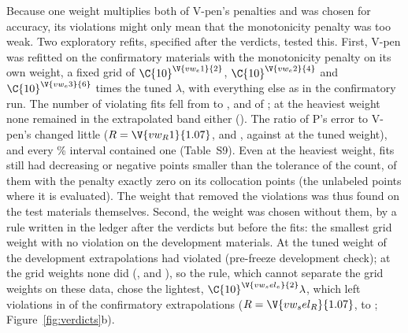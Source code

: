 \documentclass[journal=jcisd8,manuscript=article]{achemso}
\begin{document}
Because one weight multiplies both of V-pen's penalties and was chosen for accuracy, its violations might only mean
that the monotonicity penalty was too weak. Two exploratory refits, specified after the verdicts, tested this. First,
V-pen was refitted on the confirmatory materials with the monotonicity penalty on its own weight, a fixed grid of
$\C{10}^{\V{vw_e1}{2}}$, $\C{10}^{\V{vw_e2}{4}}$ and $\C{10}^{\V{vw_e3}{6}}$ times the tuned $\lambda$, with
everything else as in the confirmatory run. The number of violating fits fell from  to ,
 and  of ; at the heaviest weight none remained in the extrapolated band
either (). The ratio of P's error to V-pen's changed little ($R = \V{vw_R1}{1.07}$,  and
, against  at the tuned weight), and every \% interval contained one
(Table~S9). Even at the heaviest weight,  fits still had decreasing or negative points smaller than
the tolerance of the count,  of them with the penalty exactly zero on its collocation points (the
unlabeled points where it is evaluated). The weight that removed the violations was thus found on the test materials
themselves. Second, the weight was chosen without them, by a rule written in the ledger after the verdicts but
before the fits: the smallest grid weight with no violation on the  development materials. At
the tuned weight  of the  development extrapolations had violated (pre-freeze
development check); at the grid weights none did (,  and ), so the
rule, which cannot separate the grid weights on these data, chose the lightest, $\C{10}^{\V{vw_sel_e}{2}}\lambda$, which left violations in  of the 
confirmatory extrapolations ($R = \V{vw_sel_R}{1.07}$,  to ;
Figure~\ref{fig:verdicts}b).
\end{document}
